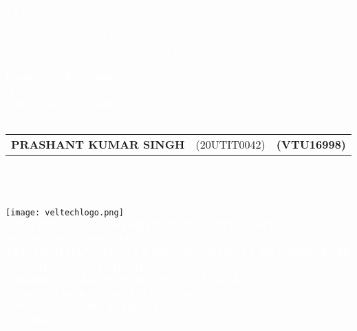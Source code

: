 \documentclass[10pt]{report}
\begin{document}
\newpage
\begin{center}
\thispagestyle{empty}
\LARGE{\textsc {\textbf{\textcolor{White}{CERT+}}}}\\[0.2cm]
\vspace{0.2cm}
\Large{\textit{\textcolor{White}{\\Major project report submitted \\in partial fulfillment of the
requirement
for award of the degree of}}}\\[0.3cm]
\Large{\textbf{\textcolor{White}{\\Bachelor of Technology\\in \\Information Technology}}}
\vspace{0.5cm}
\Large{\textbf{\textcolor{White}{\\By}}}\\[0.5cm]
\begin{table}[h]
\centering
\Large{\textcolor{White}{
\begin{tabular}{>{\bfseries}lc>{\bfseries}r}
PRASHANT KUMAR SINGH & (20UTIT0042) & (VTU16998)\\
\end{tabular}}}
\end{table}
\vspace{0.5cm}
\large{\textit{\textcolor{White}{Under the guidance of}}}\\
\large{\textit{\textcolor{White}{Mrs. J. Deepa, M.E.,\\
ASSISTANT PROFESSOR}
}}\\
\vspace{0.5cm}
\texttt{[image: veltechlogo.png]}\\
\vspace{1cm}
\large{\textbf{\textcolor{White}{DEPARTMENT OF INFORMATION TECHNOLOGY}}}\\

\large{\textbf{\textcolor{White}{SCHOOL OF COMPUTING}}}\\
\vspace{0.5cm}
\Large{\textbf{\textcolor{White}{VEL TECH RANGARAJAN DR. SAGUNTHALA R\&D INSTITUTE OF
SCIENCE \& TECHNOLOGY\\
\vspace{0.2cm}
(Deemed to be University Estd u/s 3 of UGC Act,
1956)}}}\\\Large{\textbf{\textcolor{White}{Accredited by NAAC with A++ Grade}}}\\
\large{\textbf{\textcolor{White}{CHENNAI 600 062, TAMILNADU, INDIA}}}
\vspace{0.4cm}
\large{\textbf{\textcolor{White}{\\May, 2024}}}\\
\pagecolor{Salmon}\afterpage{\nopagecolor}
\end{center}
\end{document}

